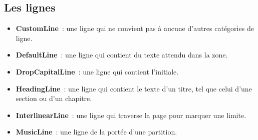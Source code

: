 \documentclass[class=article, crop=false]{standalone}
\begin{document}
\subsection{Les lignes}
\begin{itemize}
\item \textbf{CustomLine}~: une ligne qui ne convient pas à aucune d'autres catégories de ligne.
\item \textbf{DefaultLine}~: une ligne qui contient du texte attendu dans la zone.
\item \textbf{DropCapitalLine}~: une ligne qui contient l'initiale. 
\item \textbf{HeadingLine}~: une ligne qui contient le texte d'un titre, tel que celui d'une section ou d'un chapitre.
\item \textbf{InterlinearLine}~: une ligne qui traverse la page pour marquer une limite.
\item \textbf{MusicLine}~: une ligne de la portée d'une partition.
\end{itemize}
	
\end{document}
